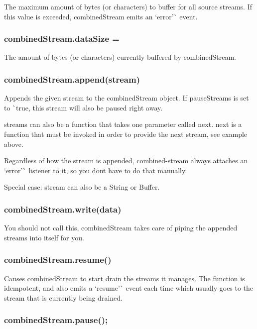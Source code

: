 The maximum amount of bytes (or characters) to buffer for all source streams. If this value is exceeded, {\ttfamily combined\+Stream} emits an `\textquotesingle{}error'\`{} event.

\subsubsection*{combined\+Stream.\+data\+Size = {}}

The amount of bytes (or characters) currently buffered by {\ttfamily combined\+Stream}.

\subsubsection*{combined\+Stream.\+append(stream)}

Appends the given {\ttfamily stream} to the combined\+Stream object. If {\ttfamily pause\+Streams} is set to \`{}true, this stream will also be paused right away.

{\ttfamily streams} can also be a function that takes one parameter called {\ttfamily next}. {\ttfamily next} is a function that must be invoked in order to provide the {\ttfamily next} stream, see example above.

Regardless of how the {\ttfamily stream} is appended, combined-\/stream always attaches an `\textquotesingle{}error'\`{} listener to it, so you don\textquotesingle{}t have to do that manually.

Special case\+: {\ttfamily stream} can also be a String or Buffer.

\subsubsection*{combined\+Stream.\+write(data)}

You should not call this, {\ttfamily combined\+Stream} takes care of piping the appended streams into itself for you.

\subsubsection*{combined\+Stream.\+resume()}

Causes {\ttfamily combined\+Stream} to start drain the streams it manages. The function is idempotent, and also emits a `\textquotesingle{}resume'\`{} event each time which usually goes to the stream that is currently being drained.

\subsubsection*{combined\+Stream.\+pause();}

